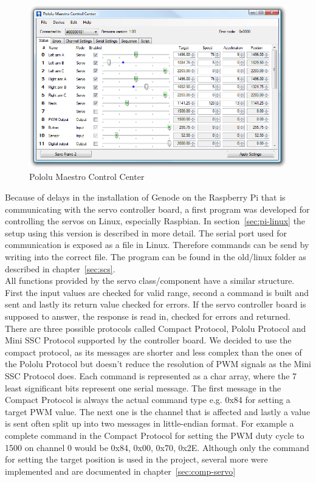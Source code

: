 \begin{figure}[h!tb]
	\centering
    \includegraphics[width=\linewidth]{images/pololucontrolcenter}
    \caption{Pololu Maestro Control Center}
    \label{fig:controlcenter}
\end{figure}

Because of delays in the installation of Genode on the Raspberry Pi that is communicating with the servo controller board, a first program was developed for controlling the servos on Linux, especially Raspbian. In section~\ref{sec:pi-linux} the setup using this version is described in more detail. The serial port used for communication is exposed as a file in Linux. Therefore commands can be send by writing into the correct file. The program can be found in the old/linux folder as described in chapter~\ref{sec:scs}.\\

All functions provided by the servo class/component have a similar structure. First the input values are checked for valid range, second a command is built and sent and lastly its return value checked for errors. If the servo controller board is supposed to answer, the response is read in, checked for errors and returned. There are three possible protocols called Compact Protocol, Pololu Protocol and Mini SSC Protocol supported by the controller board. We decided to use the compact protocol, as its messages are shorter and less complex than the ones of the Pololu Protocol but doesn't reduce the resolution of PWM signals as the Mini SSC Protocol does. Each command is represented as a char array, where the 7 least significant bits represent one serial message. The first message in the Compact Protocol is always the actual command type e.g. 0x84 for setting a target PWM value. The next one is the channel that is affected and lastly a value is sent often split up into two messages in little-endian format. For example a complete command in the Compact Protocol for setting the PWM duty cycle to 1500 on channel 0 would be 0x84, 0x00, 0x70, 0x2E. Although only the command for setting the target position is used in the project, several more were implemented and are documented in chapter~\ref{sec:comp-servo}\\

